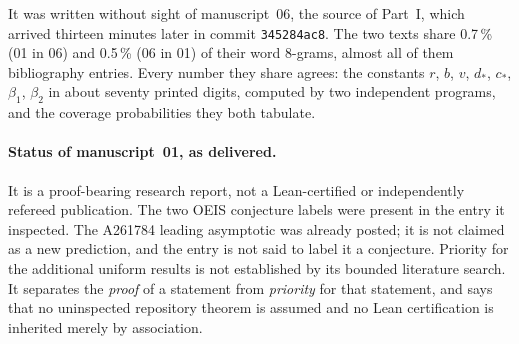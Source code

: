 \documentclass[11pt]{article}
\numberwithin{equation}{section}
\theoremstyle{definition}
\theoremstyle{remark}
\begin{document}
It was written without sight of manuscript~06, the source of Part~I, which
arrived thirteen minutes later in commit \texttt{345284ac8}. The two texts
share 0.7\,\% (01 in 06) and 0.5\,\% (06 in 01) of their word 8-grams,
almost all of them bibliography entries. Every number they share agrees:
the constants $r$, $b$, $v$, $d_*$, $c_*$, $\beta_1$, $\beta_2$ in about
seventy printed digits, computed by two independent programs, and the
coverage probabilities they both tabulate.

\paragraph{Status of manuscript~01, as delivered.} It is a proof-bearing
research report, not a Lean-certified or independently refereed
publication. The two OEIS conjecture labels were present in the entry it
inspected. The A261784 leading asymptotic was already posted; it is not
claimed as a new prediction, and the entry is not said to label it a
conjecture. Priority for the additional uniform results is not
established by its bounded literature search. It separates the
\emph{proof} of a statement from \emph{priority} for that statement, and
says that no uninspected repository theorem is assumed and no Lean
certification is inherited merely by association.
\end{document}
